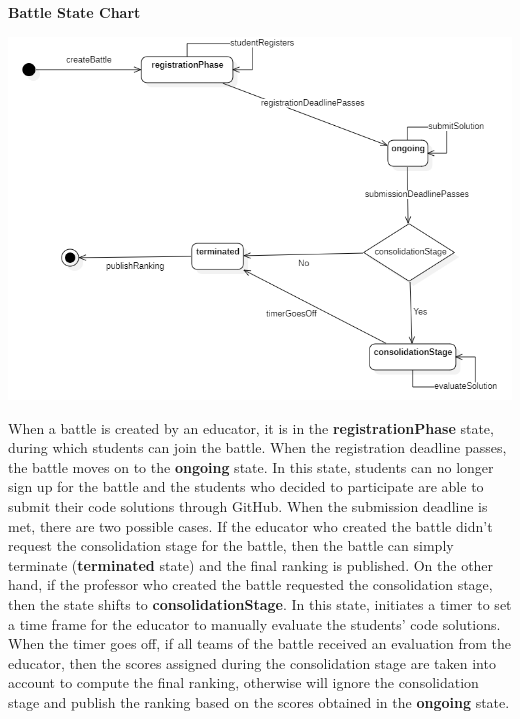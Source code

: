 \begin{minipage}{\linewidth}
\textbf{Battle State Chart}

\begin{center}
    \includegraphics[width=1\textwidth]{2Overall_Description/res/stateChartBattle.png}
\end{center}
\end{minipage}

When a battle is created by an educator, it is in the \textbf{registrationPhase} state, during which students can join the battle. When the registration deadline passes, the battle moves on to the \textbf{ongoing} state. In this state, students can no longer sign up for the battle and the students who decided to participate are able to submit their code solutions through GitHub. When the submission deadline is met, there are two possible cases. If the educator who created the battle didn't request the consolidation stage for the battle, then the battle can simply terminate (\textbf{terminated} state) and the final ranking is published. On the other hand, if the professor who created the battle requested the consolidation stage, then the state shifts to \textbf{consolidationStage}. In this state, \app initiates a timer to set a time frame for the educator to manually evaluate the students' code solutions. When the timer goes off, if all teams of the battle received an evaluation from the educator, then the scores assigned during the consolidation stage are taken into account to compute the final ranking, otherwise \app will ignore the consolidation stage and publish the ranking based on the scores obtained in the \textbf{ongoing} state.
\clearpage

